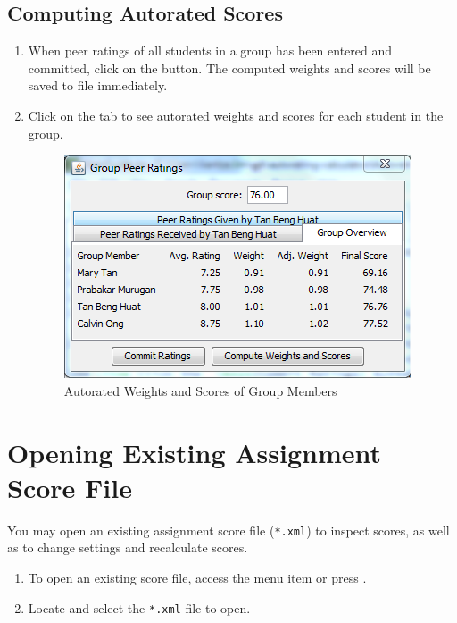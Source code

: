 \documentclass[a4paper,11pt]{refart}
\begin{document}
\subsection{Computing Autorated Scores}
\begin{enumerate}
\item When peer ratings of all students in a group has been entered and committed, click on the  button. The computed weights and scores will be saved to file immediately.
\item Click on the  tab to see autorated weights and scores for each student in the group.

\begin{figure}[hbt!]
\includegraphics[width=\textwidth]{groupoverview}
\caption{Autorated Weights and Scores of Group Members}
\end{figure}

\end{enumerate}

\section{Opening Existing Assignment Score File}
You may open an existing assignment score file (\texttt{*.xml}) to inspect scores, as well as to change settings and recalculate scores.
\begin{enumerate}
\item To open an existing score file, access the menu item  or press .
\item Locate and select the \texttt{*.xml} file to open.
\end{enumerate}
\end{document}
